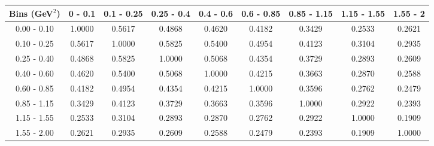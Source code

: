 \documentclass[aps, prd, reprint,showpacs,  preprintnumbers,amsmath,amssymb,superscriptaddress, nofootinbib]{revtex4-1}
\makeatletter
\renewenvironment{table}
  {\def\@captype{table}}
  {}
\makeatother
\begin{document}
\begin{table}
\centering
\begin{tabular}{ccccccccc}
\hline
Bins (GeV$^{2}$) & 0 - 0.1 & 0.1 - 0.25 & 0.25 - 0.4 & 0.4 - 0.6 & 0.6 - 0.85 & 0.85 - 1.15 & 1.15 - 1.55 & 1.55 - 2 \\ 
\hline
  0.00 -   0.10    &     1.0000  &     0.5617  &     0.4868  &     0.4620  &     0.4182  &     0.3429  &     0.2533  &     0.2621   \\ 
  0.10 -   0.25    &     0.5617  &     1.0000  &     0.5825  &     0.5400  &     0.4954  &     0.4123  &     0.3104  &     0.2935  \\ 
  0.25 -   0.40    &     0.4868  &     0.5825  &     1.0000  &     0.5068  &     0.4354  &     0.3729  &     0.2893  &     0.2609  \\ 
  0.40 -   0.60    &     0.4620  &     0.5400  &     0.5068  &     1.0000  &     0.4215  &     0.3663  &     0.2870  &     0.2588  \\ 
  0.60 -   0.85    &     0.4182  &     0.4954  &     0.4354  &     0.4215  &     1.0000  &     0.3596  &     0.2762  &     0.2479  \\ 
  0.85 -   1.15    &     0.3429  &     0.4123  &     0.3729  &     0.3663  &     0.3596  &     1.0000  &     0.2922  &     0.2393  \\ 
  1.15 -   1.55    &     0.2533  &     0.3104  &     0.2893  &     0.2870  &     0.2762  &     0.2922  &     1.0000  &     0.1909  \\ 
  1.55 -   2.00    &     0.2621  &     0.2935  &     0.2609  &     0.2588  &     0.2479  &     0.2393  &     0.1909  &     1.0000  \\ 
\hline
\hline
\end{tabular}
\caption{Correlation matrix for bins of $d\sigma/dQ^2$.}
\label{tb:pi0_Q2_cov}
\end{table}

\vspace{1cm}
\end{document}
